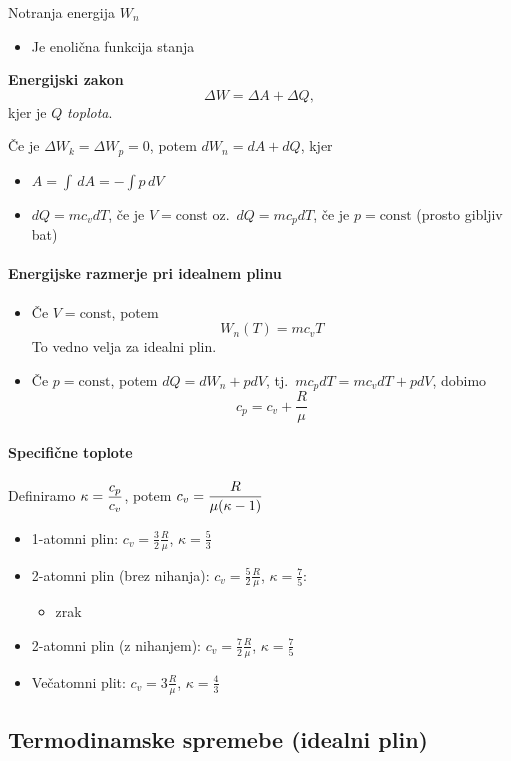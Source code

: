 Notranja energija \(W_n\)
\begin{itemize}
    \item Je enolična funkcija stanja
\end{itemize}
\textbf{Energijski zakon}
\[\Delta W = \Delta A + \Delta Q,\]
kjer je \(Q\) \emph{toplota}.

Če je \(\Delta W_k = \Delta W_p = 0\), potem \(dW_n = dA + dQ\), kjer
\begin{itemize}
    \item \(A = \int \, dA = - \int p \, dV\)
    \item \(dQ = mc_v dT\), če je \(V = \text{const}\) oz.\ \(dQ = mc_p dT\), če je \(p = \text{const}\) (prosto gibljiv bat)
\end{itemize}
\newpage
\paragraph{Energijske razmerje pri idealnem plinu}
\begin{itemize}
    \item Če \(V = \text{const}\), potem \[W_n(T) = mc_v T\]
    To vedno velja za idealni plin.
    \item Če \(p = \text{const}\), potem \(dQ = dW_n + pdV\), tj.\ \(mc_pdT = mc_vdT + pdV\), dobimo \[c_p = c_v + \frac{R}{\mu}\]
\end{itemize}
\paragraph{Specifične toplote}
Definiramo \(\displaystyle \kappa = \frac{c_p}{c_v}\), potem \(\displaystyle c_v = \frac{R}{\mu (\kappa - 1)}\)
\begin{itemize}
    \item 1-atomni plin: \(c_v = \frac{3}{2} \frac{R}{\mu}\), \(\kappa = \frac{5}{3}\)
    \item 2-atomni plin (brez nihanja): \(c_v = \frac{5}{2} \frac{R}{\mu}\), \(\kappa = \frac{7}{5}\): 
    \begin{itemize}
        \item zrak
    \end{itemize}
    \item 2-atomni plin (z nihanjem): \(c_v = \frac{7}{2} \frac{R}{\mu}\), \(\kappa = \frac{7}{5}\) 
    \item Večatomni plit: \(c_v = 3 \frac{R}{\mu}\), \(\kappa = \frac{4}{3}\)
\end{itemize}

\subsection{Termodinamske spremebe (idealni plin)}


